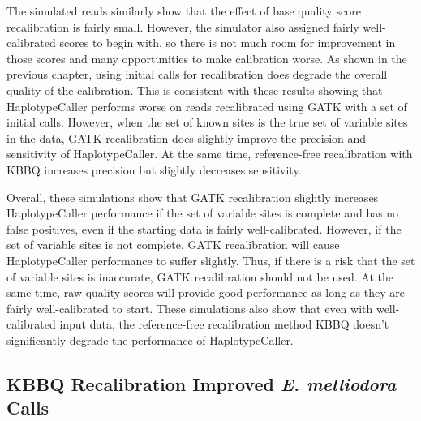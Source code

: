 The simulated reads similarly show that the effect of base quality score recalibration is fairly small. However, the simulator also assigned fairly well-calibrated scores to begin with, so there is not much room for improvement in those scores and many opportunities to make calibration worse. As shown in the previous chapter, using initial calls for recalibration does degrade the overall quality of the calibration. This is consistent with these results showing that HaplotypeCaller performs worse on reads recalibrated using GATK with a set of initial calls. However, when the set of known sites is the true set of variable sites in the data, GATK recalibration does slightly improve the precision and sensitivity of HaplotypeCaller. At the same time, reference-free recalibration with KBBQ increases precision but slightly decreases sensitivity.

Overall, these simulations show that GATK recalibration slightly increases HaplotypeCaller performance if the set of variable sites is complete and has no false positives, even if the starting data is fairly well-calibrated. However, if the set of variable sites is not complete, GATK recalibration will cause HaplotypeCaller performance to suffer slightly. Thus, if there is a risk that the set of variable sites is inaccurate, GATK recalibration should not be used. At the same time, raw quality scores will provide good performance as long as they are fairly well-calibrated to start. These simulations also show that even with well-calibrated input data, the reference-free recalibration method KBBQ doesn't significantly degrade the performance of HaplotypeCaller.

%





\subsection{KBBQ Recalibration Improved \textit{E. melliodora} Calls}


